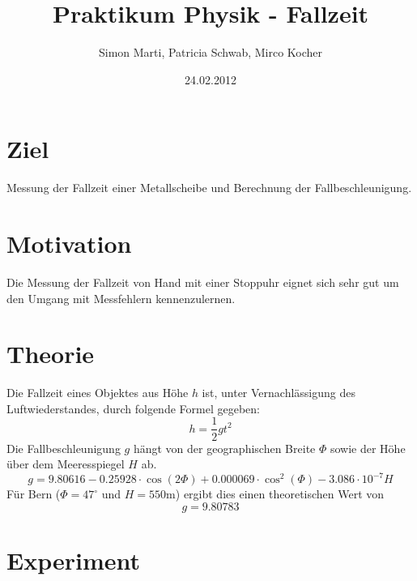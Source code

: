 \documentclass[12pt,a4paper]{article}
\title{Praktikum Physik - Fallzeit}
\author{Simon Marti, Patricia Schwab, Mirco Kocher}
\date{24.02.2012}
\begin{document}
\maketitle

\section*{Ziel}
Messung der Fallzeit einer Metallscheibe und Berechnung der Fallbeschleunigung.

\section*{Motivation}
Die Messung der Fallzeit von Hand mit einer Stoppuhr eignet sich sehr gut um den Umgang mit Messfehlern kennenzulernen. 

\section*{Theorie}
Die Fallzeit eines Objektes aus H\"ohe $h$ ist, unter Vernachl\"assigung des Luftwiederstandes, durch folgende Formel gegeben:
\[ h = \frac{1}{2}gt^2 \]
Die Fallbeschleunigung $g$ h\"angt von der geographischen Breite $\Phi$ sowie der H\"ohe \"uber dem Meeresspiegel $H$ ab.
\[ g = 9.80616 - 0.25928\cdot \cos (2\Phi ) + 0.000069\cdot \cos^2(\Phi ) - 3.086\cdot 10^{-7}H \]
F\"ur Bern ($\Phi = 47^{\circ}$ und $H = 550$m) ergibt dies einen theoretischen Wert von
\[ g = 9.80783 \]

\pagebreak
\section*{Experiment}
\end{document}
